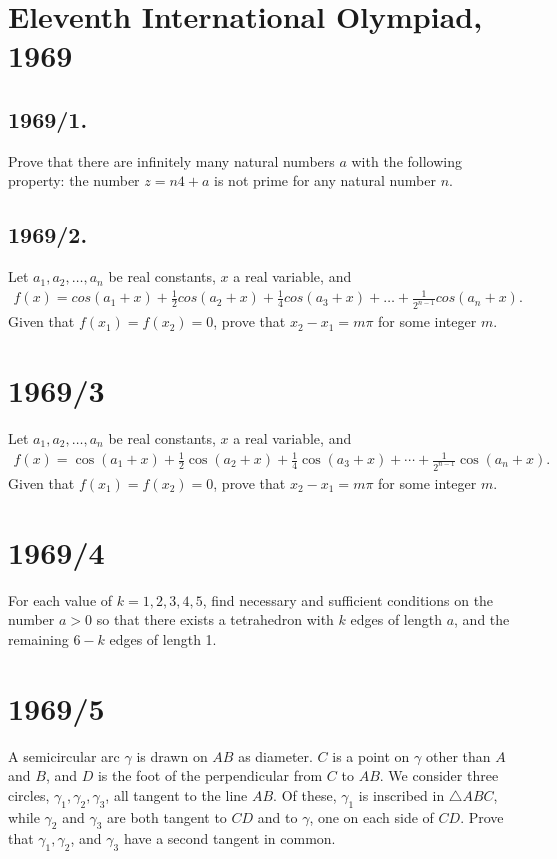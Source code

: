 \documentclass{article}
\begin{document}
\section*{Eleventh International Olympiad, 1969}

\subsection*{1969/1.}
Prove that there are infinitely many natural numbers $a$ with the following property: the number $z = n{4} + a$ is not prime for any natural number $n$.

\subsection*{1969/2.}
Let $a_1,a_2,\hdots,a_n$ be real constants, $x$ a real variable, and
	\begin{align}
		f(x) = cos(a_1 + x) + \frac{1}{2}cos(a_2 + x) + \frac{1}{4}cos(a_3 + x) + \hdots + \frac{1}{2^{n-1}}cos(a_n + x).
	\end{align}
	\noindent Given that $f(x_1) = f(x_2) = 0$, prove that $x_2 - x_1 = m\pi$ for some integer $m$.
\section*{1969/3}
Let $a_1, a_2, \dots, a_n$ be real constants, $x$ a real variable, and 
\begin{align}
    f(x) = \cos(a_1 + x) + \frac{1}{2}\cos(a_2 + x) + \frac{1}{4}\cos(a_3 + x) + \cdots + \frac{1}{2^{n-1}}\cos(a_n + x).
\end{align}
Given that $f(x_1) = f(x_2) = 0$, prove that $x_2 - x_1 = m\pi$ for some integer $m$.

\section*{1969/4}
For each value of $k = 1, 2, 3, 4, 5$, find necessary and sufficient conditions on the number $a > 0$ so that there exists a tetrahedron with $k$ edges of length $a$, and the remaining $6 - k$ edges of length 1.

\section*{1969/5}
A semicircular arc $\gamma$ is drawn on $AB$ as diameter. $C$ is a point on $\gamma$ other than $A$ and $B$, and $D$ is the foot of the perpendicular from $C$ to $AB$. We consider three circles, $\gamma_1, \gamma_2, \gamma_3$, all tangent to the line $AB$. Of these, $\gamma_1$ is inscribed in $\triangle ABC$, while $\gamma_2$ and $\gamma_3$ are both tangent to $CD$ and to $\gamma$, one on each side of $CD$. Prove that $\gamma_1, \gamma_2$, and $\gamma_3$ have a second tangent in common.
\end{document}
